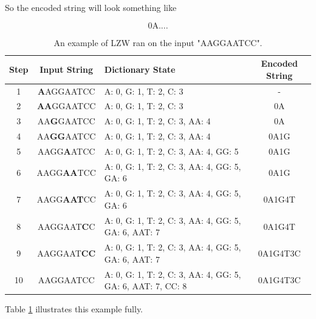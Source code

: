 \documentclass[12pt,twoside]{reedthesis}
\begin{document}
So the encoded string will look something like

\[\text{0A....}\]
\begin{table}
\begin{tabular}{ | c | c | p{} | c | }
\hline
\textbf{Step} & \textbf{Input String} & \textbf{Dictionary State} & \textbf{Encoded String} \\
\hline
1 & \textbf{A}AGGAATCC & {A: 0, G: 1, T: 2, C: 3} & - \\
\hline
2 & \textbf{AA}GGAATCC & {A: 0, G: 1, T: 2, C: 3} & 0A \\
\hline
3 & AA\textbf{G}GAATCC & {A: 0, G: 1, T: 2, C: 3, AA: 4} & 0A  \\
\hline
4 & AA\textbf{GG}AATCC & {A: 0, G: 1, T: 2, C: 3, AA: 4} & 0A1G   \\
\hline
5 & AAGG\textbf{A}ATCC & {A: 0, G: 1, T: 2, C: 3, AA: 4, GG: 5} & 0A1G \\
\hline
6 & AAGG\textbf{AA}TCC & {A: 0, G: 1, T: 2, C: 3, AA: 4, GG: 5, GA: 6} & 0A1G  \\
\hline
7 & AAGG\textbf{AAT}CC & {A: 0, G: 1, T: 2, C: 3, AA: 4, GG: 5, GA: 6} & 0A1G4T  \\
\hline
8 & AAGGAAT\textbf{C}C & {A: 0, G: 1, T: 2, C: 3, AA: 4, GG: 5, GA: 6, AAT: 7} & 0A1G4T \\
\hline
9 & AAGGAAT\textbf{CC} & {A: 0, G: 1, T: 2, C: 3, AA: 4, GG: 5, GA: 6, AAT: 7} & 0A1G4T3C \\
\hline
10 & AAGGAATCC & {A: 0, G: 1, T: 2, C: 3, AA: 4, GG: 5, GA: 6, AAT: 7, CC: 8} & 0A1G4T3C \\
\hline
\end{tabular}
\caption{ An example of LZW ran on the input "AAGGAATCC".}
\label{tab:lzwexample}
\end{table}
Table \ref{tab:lzwexample} illustrates this example fully.
\end{document}
